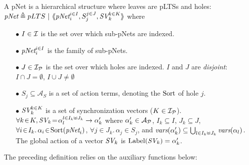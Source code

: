\documentclass{lncs/llncs}
\def\AlgAS{\mathcal{A}_S}
\begin{document}
\begin{definition}[pNets]\label{def-pnets}
A pNet is a hierarchical structure where leaves are pLTSs and holes:\\
$\pNet\triangleq pLTS~|~\mylangle \pNet_i^{i\in I}, S_j^{j\in J}, \symb{SV}_k^{k\in K}\myrangle$
where
\begin{itemize}
\item[$\bullet$] $I \in \I$ is the set over which sub-pNets are indexed.
\item[$\bullet$] $\pNet_i^{i\in I}$ is the family of sub-pNets.

\item[$\bullet$] $J\in\I_\P$ is the set over which holes are indexed.
$I$ and $J$ are \emph{disjoint}: $I\cap J=\emptyset$,  $I\cup J\neq\emptyset$
\item[$\bullet$] $S_j \subseteq \AlgAS$ is a set of action terms, denoting the $\Sort$ of
hole $j$.

\item[$\bullet$] $\symb{SV}_k^{k\in K}$ is a set of
  synchronization vectors ($K\in\I_\P$). $\forall k\!\in\! K,
  \symb{SV}_k\!=\!\alpha_{l}^{l\in I_k \uplus J_k}\to\alpha'_k$ where
  $\alpha'_k\in \mathcal{A}_\P$, $I_k\subseteq I$, $J_k\subseteq J$,
  $\forall i\!\in\!
  I_k.\,\alpha_{i}\!\in\!\Sort(\pNet_i)$,  $\forall j\!\in\!
  J_k.\,\alpha_{j}\!\in\!S_j$, and $\vars(\alpha'_k)\subseteq \bigcup_{l\in I_k\uplus 
  J_k}{\vars({\alpha_l})}$. The global action of a vector $\symb{SV}_k$ is
$\Label(\symb{SV}_k) = \alpha'_k$.


\end{itemize}
\end{definition}

The preceding definition relies on the auxiliary functions below:
\end{document}
